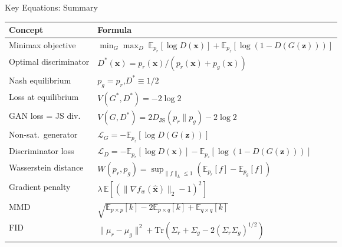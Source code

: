 \documentclass[aspectratio=169,11pt]{beamer}
\newcommand{\E}{\mathbb{E}}
\newcommand{\bx}{\bm{x}}
\newcommand{\bz}{\bm{z}}
\newcommand{\pr}{p_{r}}           %
\newcommand{\pg}{p_{g}}           %
\newcommand{\pz}{p_{z}}           %
\newcommand{\JS}{D_{\mathrm{JS}}} %
\begin{document}
\begin{frame}{Key Equations: Summary}
  \footnotesize
  \begin{center}
  \renewcommand{\arraystretch}{1.15}
  \begin{tabular}{ll}
    \toprule
    \textbf{Concept} & \textbf{Formula}\\
    \midrule
    Minimax objective
      & $\min_G\max_D\;\E_{\pr}[\log D(\bx)]+\E_{\pz}[\log(1-D(G(\bz)))]$\\[2pt]
    Optimal discriminator
      & $D^*(\bx) = \pr(\bx)/(\pr(\bx)+\pg(\bx))$\\[2pt]
    Nash equilibrium
      & $\pg=\pr$,\quad$D^*\equiv 1/2$\\[2pt]
    Loss at equilibrium
      & $V(G^*,D^*)=-2\log 2$\\[2pt]
    GAN loss = JS div.
      & $V(G,D^*)=2\JS(\pr\|\pg)-2\log 2$\\[2pt]
    Non-sat.\ generator
      & $\mathcal{L}_G=-\E_{\pz}[\log D(G(\bz))]$\\[2pt]
    Discriminator loss
      & $\mathcal{L}_D=-\E_{\pr}[\log D(\bx)]-\E_{\pz}[\log(1-D(G(\bz)))]$\\[2pt]
    Wasserstein distance
      & $W(\pr,\pg)=\sup_{\|f\|_L\le1}(\E_{\pr}[f]-\E_{\pg}[f])$\\[2pt]
    Gradient penalty
      & $\lambda\,\E[(\|\nabla f_w(\hat{\bx})\|_2-1)^2]$\\[2pt]
    MMD
      & $\sqrt{\E_{p\times p}[k]-2\E_{p\times q}[k]+\E_{q\times q}[k]}$\\[2pt]
    FID
      & $\|\mu_r-\mu_g\|^2+\mathrm{Tr}(\Sigma_r+\Sigma_g-2(\Sigma_r\Sigma_g)^{1/2})$\\
    \bottomrule
  \end{tabular}
  \end{center}
\end{frame}
\end{document}
